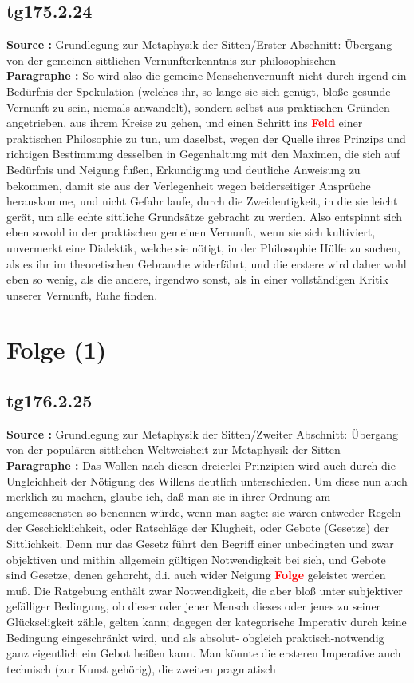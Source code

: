 \documentclass[a4paper,12pt,twoside]{book}
\newcommand{\match}[1]{\textcolor{red}{\textbf{#1}}}
\newcommand{\unnumberedsection}[1]{
	\section*{#1}
	\addcontentsline{toc}{section}{#1}
	\markright{#1}
}
\begin{document}
	\subsection*{tg175.2.24} 
	\textbf{Source : }Grundlegung zur Metaphysik der Sitten/Erster Abschnitt: Übergang von der gemeinen sittlichen Vernunfterkenntnis zur philosophischen\\  
	
	\noindent\textbf{Paragraphe : }So wird also die gemeine Menschenvernunft nicht durch irgend ein Bedürfnis der Spekulation (welches ihr, so lange sie sich genügt, bloße gesunde Vernunft zu sein, niemals anwandelt), sondern selbst aus praktischen Gründen  angetrieben, aus ihrem Kreise zu gehen, und einen Schritt ins \match{Feld} einer praktischen Philosophie zu tun, um daselbst, wegen der Quelle ihres Prinzips und richtigen Bestimmung desselben in Gegenhaltung mit den Maximen, die sich auf Bedürfnis und Neigung fußen, Erkundigung und deutliche Anweisung zu bekommen, damit sie aus der Verlegenheit wegen beiderseitiger Ansprüche herauskomme, und nicht Gefahr laufe, durch die Zweideutigkeit, in die sie leicht gerät, um alle echte sittliche Grundsätze gebracht zu werden. Also entspinnt sich eben sowohl in der praktischen gemeinen Vernunft, wenn sie sich kultiviert, unvermerkt eine Dialektik, welche sie nötigt, in der Philosophie Hülfe zu suchen, als es ihr im theoretischen Gebrauche widerfährt, und die erstere wird daher wohl eben so wenig, als die andere, irgendwo sonst, als in einer vollständigen Kritik unserer Vernunft, Ruhe finden. 
	
	\unnumberedsection{Folge (1)} 
	\subsection*{tg176.2.25} 
	\textbf{Source : }Grundlegung zur Metaphysik der Sitten/Zweiter Abschnitt: Übergang von der populären sittlichen Weltweisheit zur Metaphysik der Sitten\\  
	
	\noindent\textbf{Paragraphe : }Das Wollen nach diesen dreierlei Prinzipien wird auch durch die Ungleichheit der Nötigung des Willens deutlich unterschieden. Um diese nun auch merklich zu machen, glaube ich, daß man sie in ihrer Ordnung am angemessensten so benennen würde, wenn man sagte: sie wären entweder Regeln der Geschicklichkeit, oder Ratschläge der  Klugheit, oder Gebote (Gesetze) der Sittlichkeit. Denn nur das Gesetz führt den Begriff einer unbedingten und zwar objektiven und mithin allgemein gültigen Notwendigkeit bei sich, und Gebote sind Gesetze, denen gehorcht, d.i. auch wider Neigung \match{Folge} geleistet werden muß. Die Ratgebung enthält zwar Notwendigkeit, die aber bloß unter subjektiver gefälliger Bedingung, ob dieser oder jener Mensch dieses oder jenes zu seiner Glückseligkeit zähle, gelten kann; dagegen der kategorische Imperativ durch keine Bedingung eingeschränkt wird, und als absolut- obgleich praktisch-notwendig ganz eigentlich ein Gebot heißen kann. Man könnte die ersteren Imperative auch technisch (zur Kunst gehörig), die zweiten pragmatisch
	
\end{document}
